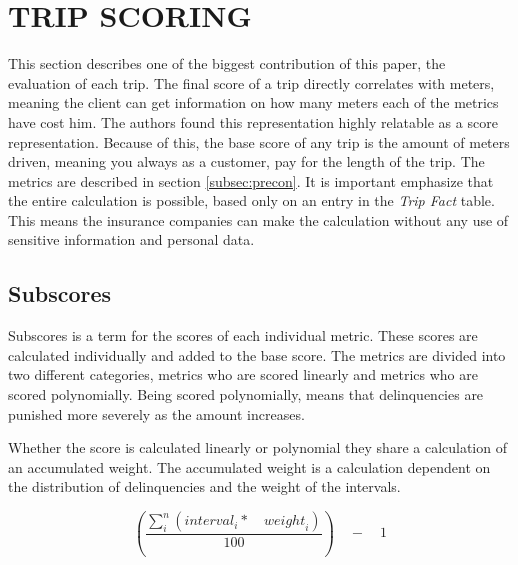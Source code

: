 \section{TRIP SCORING}\label{sec:trip}

This section describes one of the biggest contribution of this paper, the evaluation of each trip. The final score of a trip directly correlates with meters, meaning the client can get information on how many meters each of the metrics have cost him. The authors found this representation highly relatable as a score representation.
Because of this, the base score of any trip is the amount of meters driven, meaning you always as a customer, pay for the length of the trip. The metrics are described in section \ref{subsec:precon}.
It is important emphasize that the entire calculation is possible, based only on an entry in the \textit{Trip Fact} table. This means the insurance companies can make the calculation without any use of sensitive information and personal data.

\subsection{Subscores} 

Subscores is a term for the scores of each individual metric. These scores are calculated individually and added to the base score. The metrics are divided into two different categories, metrics who are scored linearly and metrics who are scored polynomially. Being scored polynomially, means that delinquencies are punished more severely as the amount increases.

Whether the score is calculated linearly or polynomial they share a calculation of an accumulated weight. The accumulated weight is a calculation dependent on the distribution of delinquencies and the weight of the intervals.

$$
\left( \frac { \sum _{ i }^{ n }{ \left( { interval }_{ i }*\quad { weight }_{ i } \right)  }  }{ 100 }  \right) \quad -\quad 1
$$

